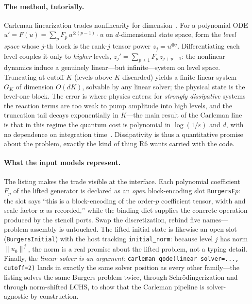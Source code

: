 \paragraph{The method, tutorially.}
Carleman linearization trades nonlinearity for
dimension~\cite{liu2021pnas,liu2023carleman}.  For a polynomial ODE
$u'=F(u)=\sum_p F_p\,u^{\otimes(p-1)}\!\cdot u$ on $d$-dimensional state
space, form the \emph{level space} whose $j$-th block is the rank-$j$
tensor power $z_j = u^{\otimes j}$.  Differentiating each level couples it
only to \emph{higher} levels, $z_j' = \sum_{p\ge 1} F_p\, z_{j+p-1}$: the
nonlinear dynamics induce a genuinely linear---but infinite---system on
level space.  Truncating at cutoff $K$ (levels above $K$ discarded)
yields a finite linear system $G_K$ of dimension $O(dK)$, solvable by any
linear solver; the physical state is the level-one block.  The error is
where physics enters: for \emph{strongly dissipative} systems the
reaction terms are too weak to pump amplitude into high levels, and the
truncation tail decays exponentially in $K$---the main result of the
Carleman line is that in this regime the quantum cost is polynomial in
$\log(1/\varepsilon)$ and $d$, with no dependence on integration
time~\cite{liu2021pnas,liu2023carleman}.  Dissipativity is thus a
quantitative promise about the problem, exactly the kind of thing R6
wants carried with the code.

\paragraph{What the input models represent.}
The listing makes the trade visible at the interface.  Each polynomial
coefficient $F_p$ of the lifted generator is declared as an \emph{open}
block-encoding slot \texttt{BurgersF$p$}: the slot says ``this is a
block-encoding of the order-$p$ coefficient tensor, width and scale
factor $\alpha$ as recorded,'' while the binding dict supplies the
concrete operation produced by the stencil ports.  Swap the
discretization, rebind five names---problem assembly is untouched.  The
lifted initial state is likewise an open slot
(\texttt{BurgersInitial}) with the host tracking \texttt{initial\_norm}:
because level $j$ has norm $\lVert u_0\rVert^{\,j}$, the norm is a real
promise about the lifted problem, not a typing detail.  Finally, the
\emph{linear solver is an argument}: \texttt{carleman\_qode(linear\_solver=...,
cutoff=2)} lands in exactly the same solver position as every other
family---the listing solves the same Burgers problem twice, through
Schr\"odingerization and through norm-shifted LCHS, to show that the
Carleman pipeline is solver-agnostic by construction.

